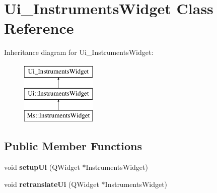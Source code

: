 \hypertarget{class_ui___instruments_widget}{}\section{Ui\+\_\+\+Instruments\+Widget Class Reference}
\label{class_ui___instruments_widget}
Inheritance diagram for Ui\+\_\+\+Instruments\+Widget\+:\begin{figure}[H]
\begin{center}
\leavevmode
\includegraphics[height=3.000000cm]{class_ui___instruments_widget}
\end{center}
\end{figure}
\subsection*{Public Member Functions}
\begin{DoxyCompactItemize}
\item 
\mbox{\label{class_ui___instruments_widget_a923ee0888c149475f41268ee7e273f50}} 
void {\bfseries setup\+Ui} (Q\+Widget $\ast$Instruments\+Widget)
\item 
\mbox{\label{class_ui___instruments_widget_a6145e24d26da55d3b169a351286e3e94}} 
void {\bfseries retranslate\+Ui} (Q\+Widget $\ast$Instruments\+Widget)
\end{DoxyCompactItemize}

